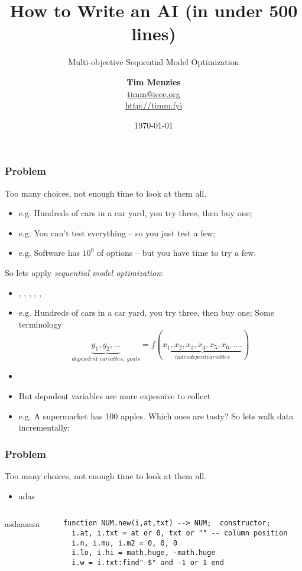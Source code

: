 \documentclass{beamer}
\title{How to  Write an AI (in under 500 lines)}
\subtitle{Multi-objective Sequential Model Optimization}
\author{{\bf Tim Menzies}\\ \href{mailto:youremail@example.com}{timm@ieee.org} \\ \href{http://yourhomepage.com}{http://timm.fyi}}
\institute{Computer Science }
\date{\today}
\begin{document}
\maketitle
\small

\begin{frame}[fragile]\frametitle{Problem}
Too many choices, not enough time to look at them all.
\begin{itemize}
\item e.g. Hundreds of cars in a car yard, you try three, then buy one;
\item e.g. You can't test everything -- so you just test a few;
\item e.g. Software has $10^9$ of options -- but you  have time to try a few.
\end{itemize}
So lets apply {\em sequential model optimization}:
\begin{itemize}
\item \citet{xia2020sequential}, 
\citet{hutter2011sequential},
\citet{nair2018finding},
\citet{hsu2018arrow},
\citet{mockus1989bayesian},
\citet{golovin17}



\item e.g. Hundreds of cars in a car yard, you try three, then buy one;
Some terminology
\[ \underbrace{y_1,y_2,...}_{\mathit{}dependent\;variables,\;goals} = f(\underbrace{x_1, x_2, x_3, x_4, x_5, x_6,....}_{\mathit{indendepent variables}})
\]
\end{itemize}
\begin{itemize}
\item 
\item But depndent variables are more expesnive to collect 
\item e.g. A supermarket has 100 apples. Which ones are tasty?
So lets walk data incrementally:
\end{itemize}
\end{frame}


\begin{frame}[fragile]\frametitle{Problem}
Too many choices, not enough time to look at them all.
\begin{itemize}
\item adas
\end{itemize}
\begin{columns} \begin{column}{.3\textwidth}
asdaasasa
\end{column}\begin{column}{.7\textwidth}\begin{verbatim}
function NUM.new(i,at,txt) --> NUM;  constructor; 
  i.at, i.txt = at or 0, txt or "" -- column position 
  i.n, i.mu, i.m2 = 0, 0, 0
  i.lo, i.hi = math.huge, -math.huge 
  i.w = i.txt:find"-$" and -1 or 1 end
\end{verbatim}
\end{column}\end{columns}
\end{frame}
\end{document}
